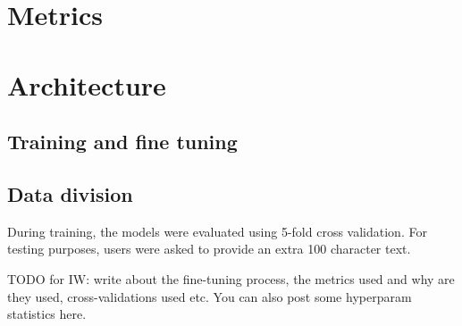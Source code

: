 \section{Metrics}

\section{Architecture}


\subsection{Training and fine tuning}


\subsection{Data division}
During training, the models were evaluated using 5-fold cross validation.
For testing purposes, users were asked to provide an extra 100 character text. 



TODO for IW: write about the fine-tuning process, the metrics used and why are they used, cross-validations used etc. You can also post some hyperparam statistics here.
